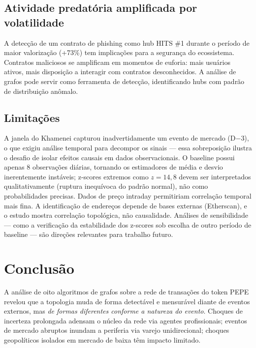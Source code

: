 \documentclass[12pt,a4paper]{article}
\begin{document}
\subsection{Atividade predatória amplificada por volatilidade}

A detecção de um contrato de phishing como hub HITS \#1 durante o período de maior valorização (+73\%) tem implicações para a segurança do ecossistema. Contratos maliciosos se amplificam em momentos de euforia: mais usuários ativos, mais disposição a interagir com contratos desconhecidos. A análise de grafos pode servir como ferramenta de detecção, identificando hubs com padrão de distribuição anômalo.

\subsection{Limitações}

A janela do Khamenei capturou inadvertidamente um evento de mercado (D$-$3), o que exigiu análise temporal para decompor os sinais --- essa sobreposição ilustra o desafio de isolar efeitos causais em dados observacionais. O baseline possui apenas 8 observações diárias, tornando os estimadores de média e desvio inerentemente instáveis; z-scores extremos como $z = 14{,}8$ devem ser interpretados qualitativamente (ruptura inequívoca do padrão normal), não como probabilidades precisas. Dados de preço intraday permitiriam correlação temporal mais fina. A identificação de endereços depende de bases externas (Etherscan), e o estudo mostra correlação topológica, não causalidade. Análises de sensibilidade --- como a verificação da estabilidade dos z-scores sob escolha de outro período de baseline --- são direções relevantes para trabalho futuro.

\section{Conclusão}

A análise de oito algoritmos de grafos sobre a rede de transações do token PEPE revelou que a topologia muda de forma detectável e mensurável diante de eventos externos, mas \textit{de formas diferentes conforme a natureza do evento}. Choques de incerteza prolongada adensam o núcleo da rede via agentes profissionais; eventos de mercado abruptos inundam a periferia via varejo unidirecional; choques geopolíticos isolados em mercado de baixa têm impacto limitado.
\end{document}
